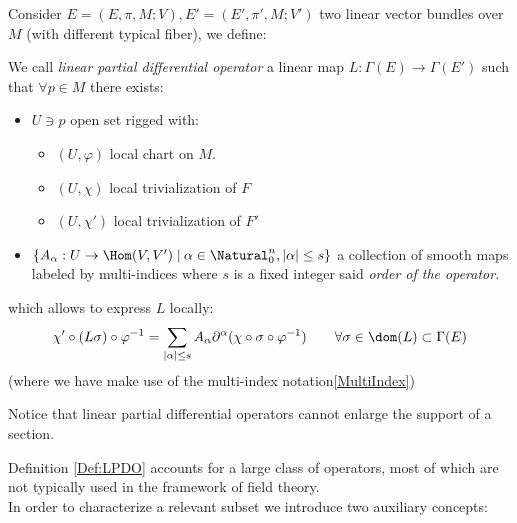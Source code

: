\documentclass[Main]{subfiles}
\begin{document}
		Consider $E=(E,\pi,M;V), E'=(E',\pi',M;V')$ two linear vector bundles over $M$ (with different typical fiber), we define:
		\begin{definition}\label{Def:LPDO}
			We call \emph{linear partial differential operator} a
			linear map $L:\Gamma(E)\rightarrow \Gamma(E')$ such that $\forall p \in M$ there exists:
		\begin{itemize}
			\item $U \ni p$ open set rigged with:
				\begin{itemize}
					\item $(U, \varphi )$ local chart on $M$.
					\item $(U, \chi)$ local trivialization of $F$
					\item $(U, \chi')$ local trivialization of $F'$
				\end{itemize}
			\item $\{A_\alpha :U \rightarrow \Hom(V,V')\; \vert \: \alpha \in \Natural_0^n, \vert \alpha \vert \leq s \}$
			a collection of smooth maps labeled by multi-indices where $s$ is a fixed integer said \emph{order of the operator}.
		\end{itemize}
		which allows to express $L$ locally:
		\begin{displaymath}
			\chi' \circ ( L \sigma) \circ \varphi^{-1} =
			\sum_{\vert \alpha \vert \leq s} A_\alpha \partial^\alpha (\chi \circ \sigma \circ \varphi^{-1} )
			\qquad \forall \sigma \in \dom(L) \subset \Gamma(E)
		\end{displaymath}
		(where we have make use of the multi-index notation\ref{MultiIndex})
	\end{definition}
		\begin{remark}\label{Obs:EnlargeSupport}
			Notice that linear partial differential operators cannot enlarge the support of a section.
		\end{remark}

		Definition \ref{Def:LPDO} accounts for a large class of operators, most of which are not typically used in the framework of field theory.\\
		In order to characterize a relevant subset we introduce two auxiliary concepts:
\end{document}
